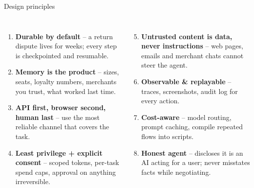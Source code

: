 \documentclass[aspectratio=169,10pt]{beamer}
\begin{document}
\begin{frame}{Design principles}
\begin{columns}[T]
\small
\begin{enumerate}
  \item \textbf{Durable by default} -- a return dispute lives for weeks; every step is checkpointed and resumable.
  \item \textbf{Memory is the product} -- sizes, seats, loyalty numbers, merchants you trust, what worked last time.
  \item \textbf{API first, browser second, human last} -- use the most reliable channel that covers the task.
  \item \textbf{Least privilege + explicit consent} -- scoped tokens, per-task spend caps, approval on anything irreversible.
\end{enumerate}
\small
\begin{enumerate}\setcounter{enumi}{4}
  \item \textbf{Untrusted content is data, never instructions} -- web pages, emails and merchant chats cannot steer the agent.
  \item \textbf{Observable \& replayable} -- traces, screenshots, audit log for every action.
  \item \textbf{Cost-aware} -- model routing, prompt caching, compile repeated flows into scripts.
  \item \textbf{Honest agent} -- discloses it is an AI acting for a user; never misstates facts while negotiating.
\end{enumerate}
\end{columns}
\end{frame}

\end{document}
